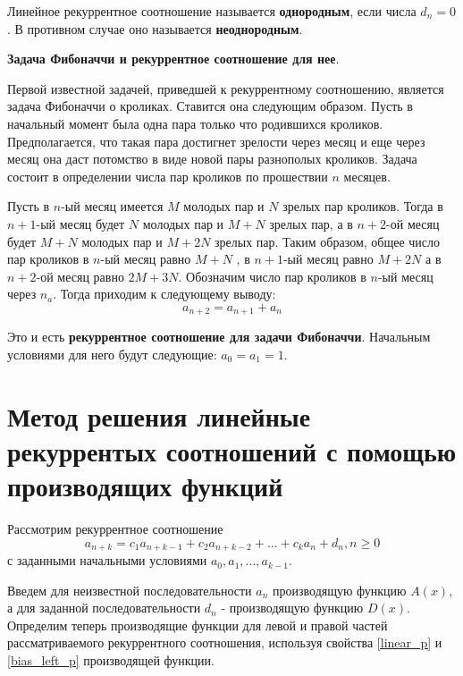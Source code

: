 \vspace{5mm}

Линейное рекуррентное соотношение называется \textbf{однородным}, если числа $d_n = 0$. В 
противном случае оно называется \textbf{неоднородным}.

\vspace{5mm}

\textbf{Задача Фибоначчи и рекуррентное соотношение для нее}.
 
Первой известной задачей, приведшей к рекуррентному соотношению,
является задача Фибоначчи о кроликах. Ставится она следующим
образом. Пусть в начальный момент была одна пара только что
родившихся кроликов. Предполагается, что такая пара достигнет зрелости
через месяц и еще через месяц она даст потомство в виде новой пары
разнополых кроликов. Задача состоит в определении числа пар кроликов
по прошествии $n$ месяцев.

Пусть в $n$-ый месяц имеется $M$ молодых пар и $N$ зрелых пар кроликов. 
Тогда в $n+1$-ый месяц будет $N$ молодых пар и $M + N$ зрелых пар, а в $n+2$-ой
месяц будет $M + N$ молодых пар и $M + 2N$ зрелых пар. Таким образом, общее число
пар кроликов в $n$-ый месяц равно $M + N$ , в $n+1$-ый месяц равно $M + 2N$
а в $n+2$-ой месяц равно $2M + 3N$. Обозначим число пар кроликов в $n$-ый месяц 
через $n_a$. Тогда приходим к следующему выводу:
\begin{equation}
    a_{n+2} = a_{n+1} + a_n
\end{equation}

Это и есть \textbf{рекуррентное соотношение для задачи Фибоначчи}. Начальным условиями для него
будут следующие: $a_0 = a_1 = 1$.

\section{Метод решения линейные рекуррентых соотношений с помощью производящих функций}
Рассмотрим рекуррентное соотношение
\begin{equation*}
    a_{n+k} = c_1 a_{n+k-1} + c_2 a_{n+k-2} + ... + c_k a_n + d_n, n \geq 0
\end{equation*}
с заданными начальными условиями $a_0, a_1, ..., a_{k-1}$.

Введем для неизвестной последовательности $a_n$ производящую функцию $A(x)$, а для заданной
последовательности $d_n$ - производящую функцию $D(x)$. Определим теперь производящие функции для
левой и правой частей рассматриваемого рекуррентного соотношения, используя свойства \ref{linear_p} и \ref{bias_left_p} производящей
функции.

